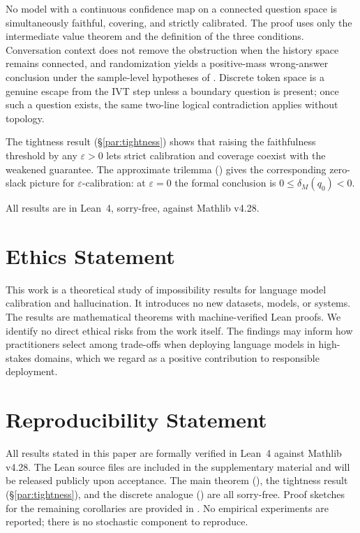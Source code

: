 \documentclass[10pt]{article}
\begin{document}
No model with a continuous confidence map on a connected question space is
simultaneously faithful, covering, and strictly calibrated. The proof uses
only the intermediate value theorem and the definition of the three
conditions. Conversation context does not remove the obstruction when the
history space remains connected, and randomization yields a positive-mass
wrong-answer conclusion under the sample-level hypotheses of
. Discrete token space is a genuine escape from the IVT
step unless a boundary question is present; once such a question exists, the
same two-line logical contradiction applies without topology.

The tightness result (\S\ref{par:tightness}) shows that raising the
faithfulness threshold by any $\varepsilon>0$ lets strict calibration and
coverage coexist with the weakened guarantee. The approximate trilemma
() gives the corresponding zero-slack picture for
$\varepsilon$-calibration: at $\varepsilon=0$ the formal conclusion is
$0\leq\delta_M(q_0)<0$.

All results are in Lean~4, sorry-free, against Mathlib v4.28.

\section*{Ethics Statement}

This work is a theoretical study of impossibility results for language model
calibration and hallucination. It introduces no new datasets, models, or
systems. The results are mathematical theorems with machine-verified Lean
proofs. We identify no direct ethical risks from the work itself. The
findings may inform how practitioners select among trade-offs when deploying
language models in high-stakes domains, which we regard as a positive
contribution to responsible deployment.

\section*{Reproducibility Statement}

All results stated in this paper are formally verified in Lean~4 against
Mathlib v4.28. The Lean source files are included in the supplementary
material and will be released publicly upon acceptance. The main theorem
(), the tightness result (\S\ref{par:tightness}), and
the discrete analogue () are all sorry-free.
Proof sketches for the remaining corollaries are provided in
. No empirical experiments are reported; there is no
stochastic component to reproduce.
\end{document}
